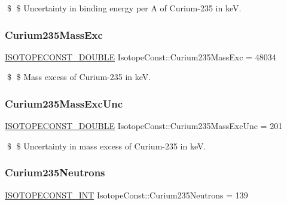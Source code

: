 \$ \$ Uncertainty in binding energy per A of Curium-\/235 in keV. \mbox{\label{group___isotope_const-_curium-_cm235_gaddf6996ec127c0ec073a04577baace5d}} 
\subsubsection{\texorpdfstring{Curium235\+Mass\+Exc}{Curium235MassExc}}
{\footnotesize\ttfamily \mbox{\hyperlink{group___isotope_const-_macros_ga8f45a7272ce02c0b4c65c44636ed719a}{I\+S\+O\+T\+O\+P\+E\+C\+O\+N\+S\+T\+\_\+\+D\+O\+U\+B\+LE}} Isotope\+Const\+::\+Curium235\+Mass\+Exc = 48034}

\$ \$ Mass excess of Curium-\/235 in keV. \mbox{\label{group___isotope_const-_curium-_cm235_ga5dd5a0d089d51a34cfdeb23920fe270d}} 
\subsubsection{\texorpdfstring{Curium235\+Mass\+Exc\+Unc}{Curium235MassExcUnc}}
{\footnotesize\ttfamily \mbox{\hyperlink{group___isotope_const-_macros_ga8f45a7272ce02c0b4c65c44636ed719a}{I\+S\+O\+T\+O\+P\+E\+C\+O\+N\+S\+T\+\_\+\+D\+O\+U\+B\+LE}} Isotope\+Const\+::\+Curium235\+Mass\+Exc\+Unc = 201}

\$ \$ Uncertainty in mass excess of Curium-\/235 in keV. \mbox{\label{group___isotope_const-_curium-_cm235_ga39892b435e37cebf0c2fa6a7925a3ad2}} 
\subsubsection{\texorpdfstring{Curium235\+Neutrons}{Curium235Neutrons}}
{\footnotesize\ttfamily \mbox{\hyperlink{group___isotope_const-_macros_ga5f18360b3e99483a35c32d789e62621c}{I\+S\+O\+T\+O\+P\+E\+C\+O\+N\+S\+T\+\_\+\+I\+NT}} Isotope\+Const\+::\+Curium235\+Neutrons = 139}

